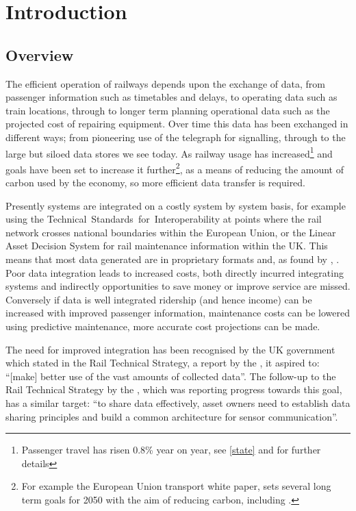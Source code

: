\chapter{Introduction}\label{ch:intro}
\section{Overview}
The efficient operation of railways depends upon the exchange of data, from passenger information such as timetables and delays, to operating data such as train locations, through to longer term planning operational data such as the projected cost of repairing equipment. Over time this data has been exchanged in different ways; from pioneering use of the telegraph for signalling, through to the large but siloed data stores we see today. As railway usage has increased\footnote{Passenger travel has risen 0.8\% year on year, see \autoref{state} and \citep{OfficeofRoad&Rail2016} for further details} and goals have been set to increase it further\footnote{For example the European Union transport white paper, \citet{EC2011} sets several long term goals for 2050 with the aim of reducing carbon, including .}, as a means of reducing the amount of carbon used by the economy, so more efficient data transfer is required. 

Presently systems are integrated on a costly system by system basis, for example using the Technical~Standards~for~Interoperability at points where the rail network crosses national boundaries within the European Union, or the Linear Asset Decision System for rail maintenance information within the UK. This means that most data generated are in proprietary formats and, as found by \citet{Kopf2010}, . Poor data integration leads to increased costs, both directly incurred integrating systems and indirectly opportunities to save money or improve service are missed. Conversely if data is well integrated ridership (and hence income) can be increased with improved passenger information, maintenance costs can be lowered using predictive maintenance, more accurate cost projections can be made.

The need for improved integration has been recognised by the UK government which stated in the Rail Technical Strategy, a report by the \citet{TechnicalStrategyLeadershipGroup2012b}, it aspired to: ``[make] better use of the vast amounts of collected data''. The follow-up to the Rail Technical Strategy by the \citet{RDG2017}, which was reporting progress towards this goal, has a similar target: ``to share data effectively, asset owners need to establish data sharing principles and build a common architecture for sensor communication''.

